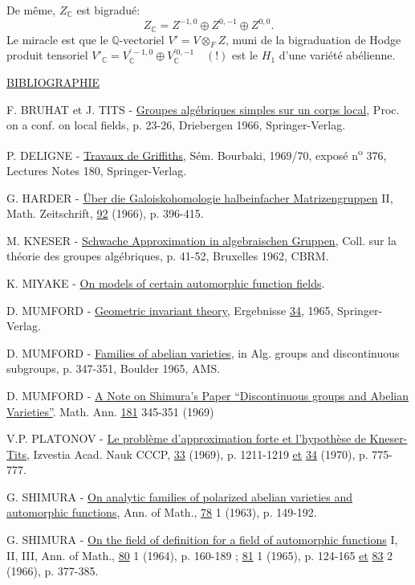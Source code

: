 \documentclass[10pt]{article}
\newcommand{\C}{\mathbb C}
\newcommand{\Q}{\mathbb Q}
\begin{document}
De même, $Z_{\C}$ est bigradué:
\[
Z_{\C}=Z^{-1,0}\oplus Z^{0,-1}\oplus Z^{0,0}.
\]
Le miracle est que le $\Q$-vectoriel $V'=V\otimes_F Z$, muni de la bigraduation de Hodge produit tensoriel
$\displaystyle V'_{\C}=V_{\C}^{\prime -1,0}\oplus V_{\C}^{\prime 0,-1}\quad(!)$ est le $H_1$ d'une variété abélienne.

\noindent\uline{BIBLIOGRAPHIE}

\vspace{1.5\baselineskip}

\begin{description}[leftmargin=3.0em,labelwidth=2.4em,labelsep=.6em,font=\normalfont,style=multiline]
\item[{[1]}] F. BRUHAT et J. TITS - \uline{Groupes algébriques simples sur un corps local}, Proc. on a conf. on local fields, p. 23-26, Driebergen 1966, Springer-Verlag.
\item[{[2]}] P. DELIGNE - \uline{Travaux de Griffiths}, Sém. Bourbaki, 1969/70, exposé n\textsuperscript{o} 376, Lectures Notes 180, Springer-Verlag.
\item[{[3]}] G. HARDER - \uline{Über die Galoiskohomologie halbeinfacher Matrizengruppen} II, Math. Zeitschrift, \uline{92} (1966), p. 396-415.
\item[{[4]}] M. KNESER - \uline{Schwache Approximation in algebraischen Gruppen}, Coll. sur la théorie des groupes algébriques, p. 41-52, Bruxelles 1962, CBRM.
\item[{[5]}] K. MIYAKE - \uline{On models of certain automorphic function fields}.
\item[{[6]}] D. MUMFORD - \uline{Geometric invariant theory}, Ergebnisse \uline{34}, 1965, Springer-Verlag.
\item[{[7]}] D. MUMFORD - \uline{Families of abelian varieties}, in Alg. groups and discontinuous subgroups, p. 347-351, Boulder 1965, AMS.
\item[{[8]}] D. MUMFORD - \uline{A Note on Shimura's Paper ``Discontinuous groups and Abelian Varieties''}. Math. Ann. \uline{181} 345-351 (1969)
\item[{[9]}] V.P. PLATONOV - \uline{Le problème d'approximation forte et l'hypothèse de Kneser-Tits}, Izvestia Acad. Nauk CCCP, \uline{33} (1969), p. 1211-1219 \uline{et} \uline{34} (1970), p. 775-777.
\item[{[10]}] G. SHIMURA - \uline{On analytic families of polarized abelian varieties and automorphic functions}, Ann. of Math., \uline{78} 1 (1963), p. 149-192.
\item[{[11]}] G. SHIMURA - \uline{On the field of definition for a field of automorphic functions} I, II, III, Ann. of Math., \uline{80} 1 (1964), p. 160-189 ; \uline{81} 1 (1965), p. 124-165 \uline{et} \uline{83} 2 (1966), p. 377-385.

\end{description}
\end{document}

